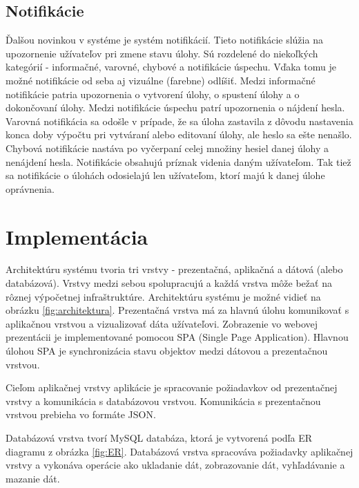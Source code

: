 \documentclass[slovak]{fitthesis}
\begin{document}
\section{Notifikácie}
Ďalšou novinkou v systéme je systém notifikácií. Tieto notifikácie slúžia na upozornenie užívateľov pri zmene stavu úlohy. Sú rozdelené do niekoľkých kategórií - informačné, varovné, chybové a notifikácie úspechu. Vďaka tomu je možné notifikácie od seba aj vizuálne (farebne) odlíšiť. Medzi informačné notifikácie patria upozornenia o vytvorení úlohy, o spustení úlohy a o dokončovaní úlohy. Medzi notifikácie úspechu patrí upozornenia o nájdení hesla. Varovná notifikácia sa odošle v prípade, že sa úloha zastavila z dôvodu nastavenia konca doby výpočtu pri vytváraní alebo editovaní úlohy, ale heslo sa ešte nenašlo. Chybová notifikácie nastáva po vyčerpaní celej množiny hesiel danej úlohy a nenájdení hesla. Notifikácie obsahujú príznak videnia daným užívateľom. Tak tiež sa notifikácie o úlohách odosielajú len užívateľom, ktorí majú k danej úlohe oprávnenia.





\chapter{Implementácia}\label{implementacia}
Architektúru systému tvoria tri vrstvy - prezentačná, aplikačná a dátová (alebo databázová). Vrstvy medzi sebou spolupracujú a každá vrstva môže bežať na rôznej výpočetnej infraštruktúre. Architektúru systému je možné vidieť na obrázku \ref{fig:architektura}.
Prezentačná vrstva má za hlavnú úlohu komunikovať s aplikačnou vrstvou a vizualizovať dáta užívateľovi. Zobrazenie vo webovej prezentácii je implementované pomocou SPA (Single Page Application). Hlavnou úlohou SPA je synchronizácia stavu objektov medzi dátovou a prezentačnou vrstvou. 

Cieľom aplikačnej vrstvy aplikácie je spracovanie požiadavkov od prezentačnej vrstvy a komunikácia s databázovou vrstvou. Komunikácia s prezentačnou vrstvou prebieha vo formáte JSON.

Databázová vrstva tvorí MySQL databáza, ktorá je vytvorená podľa ER diagramu z obrázka \ref{fig:ER}. Databázová vrstva spracováva požiadavky aplikačnej vrstvy a vykonáva operácie ako ukladanie dát, zobrazovanie dát, vyhľadávanie a mazanie dát.
\end{document}
